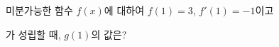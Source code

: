 미분가능한 함수 $f(x)$에 대하여 $f(1)=3$, $f'(1)=-1$이고 \par\smallskip{}\par\smallskip\noindent 가 성립할 때, $g(1)$의 값은? 
